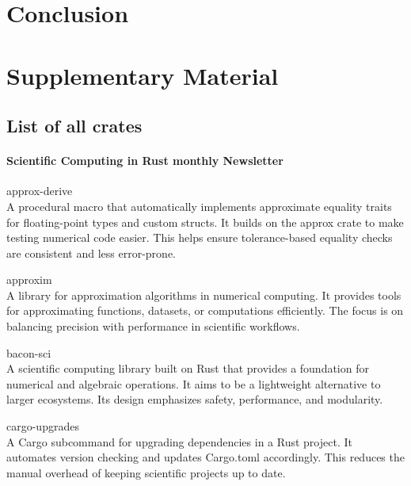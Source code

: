 \documentclass{article}
\begin{document}
\section{Conclusion}
\label{section:conclusion}

\printbibliography

\pagebreak
{}
\renewcommand{\thesubsection}{S\arabic{supplementSection}}
\newcommand{\supplement}[1]{%
    \stepcounter{supplementSection}%
    \subsection{#1}
}
\renewcommand{\thesection}{}

\section{Supplementary Material}
\supplement{List of all crates}

\paragraph{Scientific Computing in Rust monthly Newsletter}

approx-derive\\
A procedural macro that automatically implements approximate equality traits for
floating-point types and custom structs. It builds on the approx crate to make testing numerical
code easier. This helps ensure tolerance-based equality checks are consistent and less error-prone.

approxim\\
A library for approximation algorithms in numerical computing. It provides tools for
approximating functions, datasets, or computations efficiently. The focus is on balancing precision
with performance in scientific workflows.

bacon-sci\\
A scientific computing library built on Rust that provides a foundation for numerical
and algebraic operations. It aims to be a lightweight alternative to larger ecosystems. Its design
emphasizes safety, performance, and modularity.

cargo-upgrades\\
A Cargo subcommand for upgrading dependencies in a Rust project. It automates
version checking and updates Cargo.toml accordingly. This reduces the manual overhead of keeping
scientific projects up to date.
\end{document}
